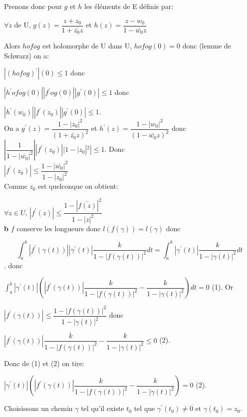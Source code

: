 \documentclass[a4paper, 12pt, twoside]{book}
\begin{document}
Prenons donc pour $g$ et $h$ les éléments de E définis par:\

 
$\forall z$ de U, $g(z)=\dfrac{z+z_{0}}{1+\bar{z_{0}}z}$ et $h(z)=\dfrac{z-w_{0}}{1-\bar{w_{0}}z}$\

Alors $hofog$ est holomorphe de U dans U, $hofog(0)=0$ donc (lemme de Schwarz) on a:\



   $|(hofog)^{'}|(0)\leq 1$ donc\
   
   $|h^{'}ofog(0)||f^{'}og(0)||g^{'}(0)|\leq 1$ donc\
   
    
   $|h^{'}(w_{0})||f^{'}(z_{0})||g^{'}(0)|\leq 1$.\\
   
   
   On a $g^{'}(z)=\dfrac{1-|z_{0}|^{2}}{(1+\bar{z_{0}}z)^{2}}$ et $h^{'}(z)=\dfrac{1-|w_{0}|^{2}}{(1-\bar{w_{0}}z)^{2}}$ donc \\
   
   
   $|\dfrac{1}{1-|\bar{w_{0}}|^{2}}||f^{'}(z_{0})||1-|z_{0}|^{2}|\leq 1$. Donc\\ 
   
   $|f^{'}(z_{0})|\leq \dfrac{1-|\bar{w_{0}}|^{2}}{1-|z_{0}|^{2}}$\\
   
   Comme $z_{0}$ est quelconque on obtient:\
   
   $\forall z\in U$, $|f^{'}(z)|\leq \dfrac{1-|\bar{f(z)}|^{2}}{1-|z|^{2}}$\\
   
   \textbf{b}  $f$ conserve les longueurs donc $l(f(\gamma))=l(\gamma)$ donc \
 
 $$\int_{a}^{b} |f^{'}(\gamma(t))||\gamma^{'}(t)|\dfrac{k}{1-|f(\gamma(t))|^{2}}dt=\int_{a}^{b} |\gamma^{'}(t)|\dfrac{k}{1-|\gamma(t)|^{2}}dt$$. donc\
 
 
 $\int_{a}^{b} |\gamma^{'}(t)|(|f^{'}(\gamma(t))|\dfrac{k}{1-|f(\gamma(t))|^{2}}-\dfrac{k}{1-|\gamma(t)|^{2}})dt=0 $  (1).  Or\
 
 $|f^{'}(\gamma(t))|\leq \dfrac{1-|f(\gamma(t))|^{2}}{1-|\gamma(t)|^{2}}$ donc\
 
  $|f^{'}(\gamma(t))|\dfrac{k}{1-|f(\gamma(t))|^{2}}-\dfrac{k}{1-|\gamma(t)|^{2}}\leq 0$ (2).\
  
  Donc de (1) et (2) on tire:\
  
    $|\gamma^{'}(t)|(|f^{'}(\gamma(t))|\dfrac{k}{1-|f(\gamma(t))|^{2}}-\dfrac{k}{1-|\gamma(t)|^{2}})= 0$ (2).\
 
Choisissons un chemin $\gamma$ tel qu'il existe $t_{0}$ tel que $\gamma^{'}(t_{0})\neq 0$ et $\gamma(t_{0})=z_{0}$.\
  
\end{document}
